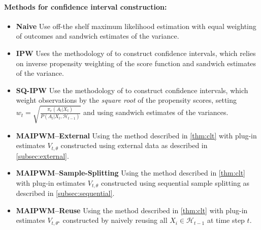 \documentclass[11pt]{article}
\begin{document}
\paragraph{Methods for confidence interval construction:}
\begin{itemize}
    \item \textbf{Naive} Use off-the shelf maximum likelihood estimation with equal weighting of outcomes and sandwich estimates of the variance. 
    \item \textbf{IPW} Uses the methodology of \cite{guo2025statisticalinferencemisspecifiedcontextual} to construct confidence intervals, which relies on inverse propensity weighting of the score function and sandwich estimates of the variance. 
    \item \textbf{SQ-IPW} Use the methodology of \cite{zhang2021mestimators} to construct confidence intervals, which weight observations by the \emph{square root} of the propensity scores, setting $w_{t} = \sqrt{\frac{\pi_{e}(A_t|X_t) }{P(A_t|X_t,\mathcal{H}_{t-1}) }}$ and using sandwich estimates of the variances. 
    \item \textbf{MAIPWM--External} Using the method described in \cref{thm:clt} with plug-in estimates $V_{t,\theta}$ constructed using external data as described in \cref{subsec:external}.
    \item \textbf{MAIPWM--Sample-Splitting} Using the method described in \cref{thm:clt} with plug-in estimates $V_{t,\theta}$ constructed using sequential sample splitting as described in \cref{subsec:sequential}.
    \item \textbf{MAIPWM--Reuse}  Using the method described in \cref{thm:clt} with plug-in estimates $V_{t,\theta^{\star}}$ constructed by naively reusing all $X_{i} \in \mathcal{H}_{t-1}$ at time step $t$.

\end{itemize}
\end{document}
